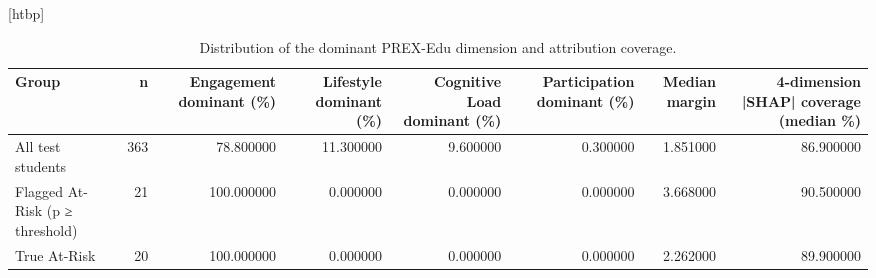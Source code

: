 \begin{table}
\small[htbp]
\caption{Distribution of the dominant PREX-Edu dimension and attribution coverage.}
\label{tab:S09_dominant_distribution}
\begin{tabular}{lrrrrrrr}
\toprule
Group & n & Engagement dominant (\%) & Lifestyle dominant (\%) & Cognitive Load dominant (\%) & Participation dominant (\%) & Median margin & 4-dimension |SHAP| coverage (median \%) \\
\midrule
All test students & 363 & 78.800000 & 11.300000 & 9.600000 & 0.300000 & 1.851000 & 86.900000 \\
Flagged At-Risk (p ≥ threshold) & 21 & 100.000000 & 0.000000 & 0.000000 & 0.000000 & 3.668000 & 90.500000 \\
True At-Risk & 20 & 100.000000 & 0.000000 & 0.000000 & 0.000000 & 2.262000 & 89.900000 \\
\bottomrule
\end{tabular}
\end{table}
